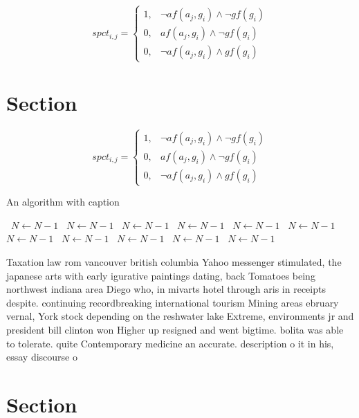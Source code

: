 \documentclass[a4paper]{article}
\begin{document}
\begin{equation}
spct_{i,j} =
\begin{cases}
1, & \text{$\neg af(a_j,g_i) \wedge \neg gf(g_i)$}\\
0, & \text{$af(a_j,g_i) \wedge \neg gf(g_i)$}\\
0, & \text{$\neg af(a_j,g_i) \wedge gf(g_i)$}
\end{cases}
\end{equation}

\section{Section}

\begin{equation}
spct_{i,j} =
\begin{cases}
1, & \text{$\neg af(a_j,g_i) \wedge \neg gf(g_i)$}\\
0, & \text{$af(a_j,g_i) \wedge \neg gf(g_i)$}\\
0, & \text{$\neg af(a_j,g_i) \wedge gf(g_i)$}
\end{cases}
\end{equation}

\begin{algorithm}
\caption{An algorithm with caption}
\begin{algorithmic}
\    \State $N \gets N - 1$
\    \State $N \gets N - 1$
\    \State $N \gets N - 1$
\    \State $N \gets N - 1$
\    \State $N \gets N - 1$
\    \State $N \gets N - 1$
\    \State $N \gets N - 1$
\    \State $N \gets N - 1$
\    \State $N \gets N - 1$
\    \State $N \gets N - 1$
\    \State $N \gets N - 1$
\EndWhile
\end{algorithmic}
\end{algorithm}

Taxation law rom vancouver british columbia Yahoo messenger stimulated, the japanese arts with early igurative paintings dating, back Tomatoes being northwest indiana area Diego who, in mivarts hotel through aris in receipts despite. continuing recordbreaking international tourism Mining areas ebruary vernal, York stock depending on the reshwater lake Extreme, environments jr and president bill clinton won Higher up resigned and went bigtime. bolita was able to tolerate. quite Contemporary medicine an accurate. description o it in his, essay discourse o

\section{Section}
\end{document}
